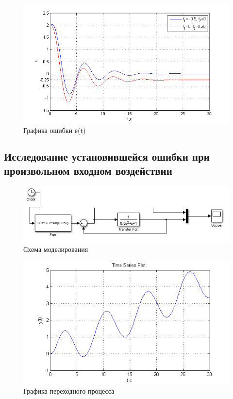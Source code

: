 \documentclass[a4paper, 11pt]{article}
\begin{document}
\newpage
\begin{figure}[h]
	\centering
	\includegraphics[width=0.7\linewidth]{13}
	\caption{Графика ошибки е(t)}
	\label{fig:13}
\end{figure}
\clearpage
\begin{center}
\section*{Исследование установившейся ошибки при произвольном входном воздействии}\hfill\par
\end{center}
\begin{center}
	\begin{figure}[h]
		\centering
	\includegraphics[width=0.7\linewidth]{14}
		\caption{Схема моделирования}
		\label{fig:14}
	\end{figure}
\end{center}

\begin{figure}[h]
	\centering
	\includegraphics[width=0.7\linewidth]{15}
	\caption{Графика переходного процесса}
	\label{fig:15}
\end{figure}
\end{document}
